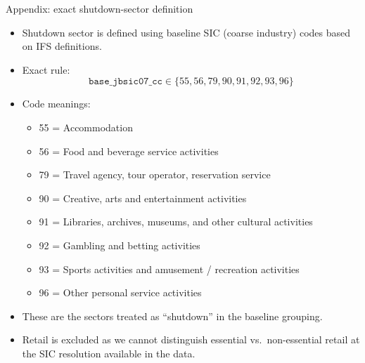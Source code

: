\documentclass[aspectratio=169,11pt]{beamer}
\begin{document}
\appendix

\begin{frame}{Appendix: exact shutdown-sector definition} \label{ifs-shutdown-sec}
\begin{itemize}
  \item Shutdown sector is defined using baseline SIC (coarse industry) codes based on IFS definitions.
  \item Exact rule:
  \[
    \texttt{base\_jbsic07\_cc} \in \{55,56,79,90,91,92,93,96\}
  \]
  \item Code meanings:
    \begin{itemize}
      \item 55 = Accommodation
      \item 56 = Food and beverage service activities
      \item 79 = Travel agency, tour operator, reservation service
      \item 90 = Creative, arts and entertainment activities
      \item 91 = Libraries, archives, museums, and other cultural activities
      \item 92 = Gambling and betting activities
      \item 93 = Sports activities and amusement / recreation activities
      \item 96 = Other personal service activities
    \end{itemize}
  \item These are the sectors treated as ``shutdown'' in the baseline grouping.
  \item Retail is excluded as we cannot distinguish essential vs.\ non-essential retail at the SIC resolution available in the data.
\end{itemize}

\hyperlink{group_defs}{}
\end{frame}
\end{document}
